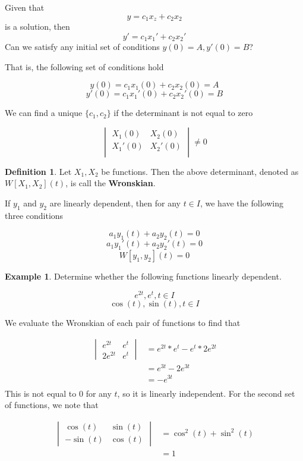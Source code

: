 \documentclass[11pt]{article}
\theoremstyle{plain} %
\theoremstyle{definition}
\newtheorem*{definition}{Definition} %
\theoremstyle{example}
\newtheorem*{example}{Example}
\theoremstyle{remark}
\begin{document}
Given that $$y = c_1x_z + c_2x_2$$ is a solution, then $$y' = c_1x_1' + c_2x_2'$$ Can we satisfy any initial set of conditions $y(0) = A, y'(0) = B$?

That is, the following set of conditions hold

$$y(0) = c_1x_1(0) + c_2x_2(0) = A$$
$$y'(0) = c_1x_1'(0) + c_2x_2'(0) = B$$

We can find a unique $\{c_1,c_2\}$ if the determinant is not equal to zero

$$\begin{vmatrix}
X_1(0) & X_2(0) \\ 
X_1'(0) & X_2'(0) \\ 
\end{vmatrix} \neq 0$$

\begin{definition}
Let $X_1, X_2$ be functions. Then the above determinant, denoted as $W[X_1, X_2](t)$, is call the \textbf{Wronskian}.
\end{definition}

If $y_1$ and $y_2$ are linearly dependent, then for any $t \in I$, we have the following three conditions

$$a_1y_1(t) + a_2y_2(t) = 0$$
$$a_1y_1'(t) + a_2y_2'(t) = 0$$
$$W[y_1, y_2](t) = 0$$

\begin{example}
Determine whether the following functions linearly dependent.

$$e^{2t}, e^t, t\in I$$
$$\cos(t) , \sin(t), t\in I$$


\end{example}

We evaluate the Wronskian of each pair of functions to find that 

\begin{align*}
\begin{vmatrix}
e^{2t} & e^t \\ 
2e^{2t} & e^t
\end{vmatrix} &= e^{2t}*e^t - e^t*2e^{2t}\\
&= e^{3t} - 2e^{3t} \\
&= -e^{3t} \\
\end{align*}
This is not equal to $0$ for any $t$, so it is linearly independent. For the second set of functions, we note that 

\begin{align*}
\begin{vmatrix}
\cos(t) & \sin(t) \\
-\sin(t) & \cos(t)
\end{vmatrix} &= \cos^2(t) + \sin^2(t) \\
&= 1
\end{align*}
\end{document}
